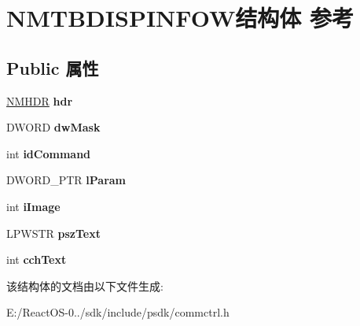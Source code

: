 \hypertarget{struct_n_m_t_b_d_i_s_p_i_n_f_o_w}{}\section{N\+M\+T\+B\+D\+I\+S\+P\+I\+N\+F\+O\+W结构体 参考}
\label{struct_n_m_t_b_d_i_s_p_i_n_f_o_w}
\subsection*{Public 属性}
\begin{DoxyCompactItemize}
\item 
\mbox{\label{struct_n_m_t_b_d_i_s_p_i_n_f_o_w_aa9375fbb409c8bd711cc4722ab2c99be}} 
\hyperlink{structtag_n_m_h_d_r}{N\+M\+H\+DR} {\bfseries hdr}
\item 
\mbox{\label{struct_n_m_t_b_d_i_s_p_i_n_f_o_w_af179d27e2ef9903f9fafd14db309f9fa}} 
D\+W\+O\+RD {\bfseries dw\+Mask}
\item 
\mbox{\label{struct_n_m_t_b_d_i_s_p_i_n_f_o_w_a9858d6a3c86a60c118e7283275c3ee55}} 
int {\bfseries id\+Command}
\item 
\mbox{\label{struct_n_m_t_b_d_i_s_p_i_n_f_o_w_a2f0f34c4cf994ea475dcbebd870b7674}} 
D\+W\+O\+R\+D\+\_\+\+P\+TR {\bfseries l\+Param}
\item 
\mbox{\label{struct_n_m_t_b_d_i_s_p_i_n_f_o_w_a0c554a0fe3113687c649d27b79e06e88}} 
int {\bfseries i\+Image}
\item 
\mbox{\label{struct_n_m_t_b_d_i_s_p_i_n_f_o_w_a331276de38cb5c0f38f996deba8dc8d0}} 
L\+P\+W\+S\+TR {\bfseries psz\+Text}
\item 
\mbox{\label{struct_n_m_t_b_d_i_s_p_i_n_f_o_w_ae8312a770a849459dc6f3509332d919f}} 
int {\bfseries cch\+Text}
\end{DoxyCompactItemize}


该结构体的文档由以下文件生成\+:\begin{DoxyCompactItemize}
\item 
E\+:/\+React\+O\+S-\/0../sdk/include/psdk/commctrl.\+h\end{DoxyCompactItemize}
